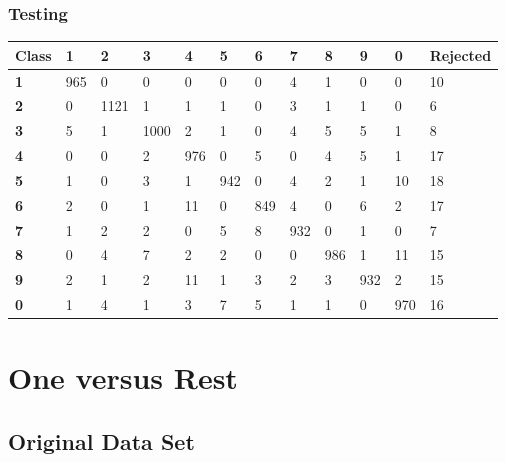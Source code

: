 \documentclass[
  a4paper,            %
  DIV=10,             %
  oneside,            %
  BCOR=5mm,           %
  parskip=half,       %
  numbers=noenddot,   %
  bibtotoc,           %
  listof=totoc        %
]{scrreprt}
\let\oldchapter\chapter
\renewcommand{\chapter}{\par\oldchapter}
\begin{document}
\subsection{Testing}
\begin{center}
  \begin{tabular}{|p{1cm}|p{1cm}|p{1cm}|p{1cm}|p{1cm}|p{1cm}|p{1cm}|p{1cm}|p{1cm}|p{1cm}|p{1cm}|p{1.7cm}|}
    \hline
    \textbf{Class} & \textbf{1} & \textbf{2} & \textbf{3} & \textbf{4} & \textbf{5} & \textbf{6} & \textbf{7} & \textbf{8} & \textbf{9} & \textbf{0} & \textbf{Rejected} \\
    \hline
    \textbf{1} & 965 & 0 & 0 & 0 & 0 & 0 & 4 & 1 & 0 & 0 & 10 \\
    \hline
    \textbf{2} & 0 & 1121 & 1 & 1 & 1 & 0 & 3 & 1 & 1 & 0 & 6 \\
    \hline
    \textbf{3} & 5 & 1 & 1000 & 2 & 1 & 0 & 4 & 5 & 5 & 1 & 8 \\
    \hline
    \textbf{4} & 0 & 0 & 2 & 976 & 0 & 5 & 0 & 4 & 5 & 1 & 17 \\
    \hline
    \textbf{5} & 1 & 0 & 3 & 1 & 942 & 0 & 4 & 2 & 1 & 10 & 18 \\
    \hline
    \textbf{6} & 2 & 0 & 1 & 11 & 0 & 849 & 4 & 0 & 6 & 2 & 17 \\
    \hline
    \textbf{7} & 1 & 2 & 2 & 0 & 5 & 8 & 932 & 0 & 1 & 0 & 7 \\
    \hline
    \textbf{8} & 0 & 4 & 7 & 2 & 2 & 0 & 0 & 986 & 1 & 11 & 15 \\
    \hline
    \textbf{9} & 2 & 1 & 2 & 11 & 1 & 3 & 2 & 3 & 932 & 2 & 15 \\
    \hline
    \textbf{0} & 1 & 4 & 1 & 3 & 7 & 5 & 1 & 1 & 0 & 970 & 16 \\
    \hline
  \end{tabular}
\end{center}
\chapter{One versus Rest}
\section{Original Data Set}
\end{document}
